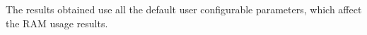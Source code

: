 The results obtained use all the default user configurable parameters, which affect the RAM usage results.

